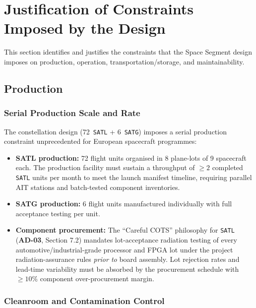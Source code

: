 \section{Justification of Constraints Imposed by the Design}
\label{sec:constraints}

This section identifies and justifies the constraints that the Space Segment design imposes on production, operation, transportation/storage, and maintainability.

\subsection{Production}
\label{sec:constraints_production}

\subsubsection{Serial Production Scale and Rate}

The constellation design (72~\texttt{SATL} + 6~\texttt{SATG}) imposes a serial production constraint unprecedented for European spacecraft programmes:
\begin{itemize}
    \item \textbf{SATL production:} 72 flight units organised in 8 plane-lots of 9 spacecraft each. The production facility must sustain a throughput of $\ge 2$ completed \texttt{SATL} units per month to meet the launch manifest timeline, requiring parallel AIT stations and batch-tested component inventories.
    \item \textbf{SATG production:} 6 flight units manufactured individually with full acceptance testing per unit.
    \item \textbf{Component procurement:} The ``Careful COTS'' philosophy for \texttt{SATL} (\textbf{AD-03}, Section 7.2) mandates lot-acceptance radiation testing of every automotive/industrial-grade processor and FPGA lot under the project radiation-assurance rules \emph{prior to} board assembly. Lot rejection rates and lead-time variability must be absorbed by the procurement schedule with $\ge 10\%$ component over-procurement margin.
\end{itemize}

\subsubsection{Cleanroom and Contamination Control}

